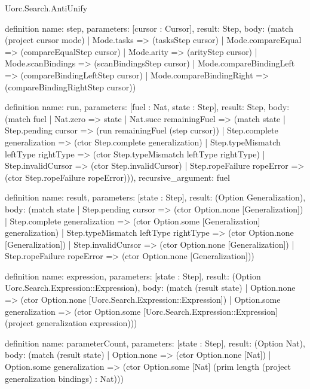 \begin{lexlean}{Uorc.Search.AntiUnify}
\begin{semanticmodule}
definition{
  name: step,
  parameters: [cursor : Cursor],
  result: Step,
  body: (match (project cursor mode)
    | Mode.tasks => (tasksStep cursor)
    | Mode.compareEqual => (compareEqualStep cursor)
    | Mode.arity => (arityStep cursor)
    | Mode.scanBindings => (scanBindingsStep cursor)
    | Mode.compareBindingLeft => (compareBindingLeftStep cursor)
    | Mode.compareBindingRight => (compareBindingRightStep cursor))
}

definition{
  name: run,
  parameters: [fuel : Nat, state : Step],
  result: Step,
  body: (match fuel
    | Nat.zero => state
    | Nat.succ remainingFuel => (match state
      | Step.pending cursor => (run remainingFuel (step cursor))
      | Step.complete generalization => (ctor Step.complete generalization)
      | Step.typeMismatch leftType rightType => (ctor Step.typeMismatch leftType rightType)
      | Step.invalidCursor => (ctor Step.invalidCursor)
      | Step.ropeFailure ropeError => (ctor Step.ropeFailure ropeError))),
  recursive_argument: fuel
}

definition{
  name: result,
  parameters: [state : Step],
  result: (Option Generalization),
  body: (match state
    | Step.pending cursor => (ctor Option.none [Generalization])
    | Step.complete generalization => (ctor Option.some [Generalization] generalization)
    | Step.typeMismatch leftType rightType => (ctor Option.none [Generalization])
    | Step.invalidCursor => (ctor Option.none [Generalization])
    | Step.ropeFailure ropeError => (ctor Option.none [Generalization]))
}

definition{
  name: expression,
  parameters: [state : Step],
  result: (Option Uorc.Search.Expression::Expression),
  body: (match (result state)
    | Option.none => (ctor Option.none [Uorc.Search.Expression::Expression])
    | Option.some generalization => (ctor Option.some [Uorc.Search.Expression::Expression] (project generalization expression)))
}

definition{
  name: parameterCount,
  parameters: [state : Step],
  result: (Option Nat),
  body: (match (result state)
    | Option.none => (ctor Option.none [Nat])
    | Option.some generalization => (ctor Option.some [Nat] (prim length (project generalization bindings) : Nat)))
}


\end{semanticmodule}
\end{lexlean}
